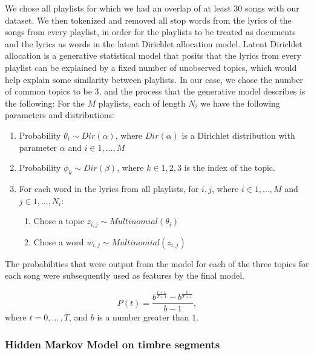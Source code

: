 \documentclass[acmtog]{acmart}
\begin{document}
We chose all playlists for which we had an overlap of at least 30 songs with our dataset. We then tokenized and removed all stop words from the lyrics of the songs from every playlist, in order for the playlists to be treated as documents and the lyrics as words in the latent Dirichlet allocation model. Latent Dirichlet allocation is a generative statistical model that posits that the lyrics from every playlist can be explained by a fixed number of unobserved topics, which would help explain some similarity between playlists. In our case, we chose the number of common topics to be 3, and the process that the generative model describes is the following: \newline
For the $M$ playlists, each of length $N_{i}$ we have the following parameters and distributions:
\begin{enumerate}
  \item Probability $\theta_{i} \sim Dir(\alpha)$, where $Dir(\alpha)$ is a Dirichlet distribution with parameter $\alpha$ and $i \in {1, ..., M}$
  \item Probability $\phi_{k} \sim Dir(\beta)$, where $k \in {1,2,3}$ is the index of the topic.
  \item For each word in the lyrics from all playlists, for $i, j$, where $i \in {1, ..., M}$ and $j \in {1, ..., N_{i}}$:
     \begin{enumerate}
       \item Chose a topic $z_{i, j} \sim Multinomial(\theta_{i})$
       \item Chose a word $w_{i, j} \sim Multinomial(z_{i, j})$
     \end{enumerate}
\end{enumerate}

The probabilities that were output from the model for each of the three topics for each song were subsequently used as features by the final model.

\begin{equation}
\label{eqn:01}
P(t)=\frac{b^{\frac{t+1}{T+1}}-b^{\frac{t}{T+1}}}{b-1},
\end{equation}
where $t=0,{\ldots}\,,T$, and $b$ is a number greater than $1$.

\subsubsection{Hidden Markov Model on timbre segments}
\end{document}
